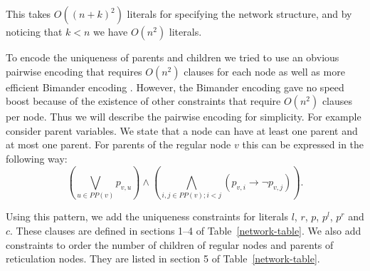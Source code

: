 \documentclass[runningheads, envcountsame, a4paper]{llncs}
\begin{document}
This takes $O((n + k)^2)$ literals for specifying the network structure, and by noticing that $k < n$ we have $O(n^2)$ literals.

To encode the uniqueness of parents and children we tried to use an obvious pairwise encoding that requires 
$O(n^2)$ clauses for each node as well as more efficient Bimander encoding \cite{nguyenefficient}. However, the Bimander encoding gave no speed boost because of the existence of other constraints that require $O(n^2)$ clauses per node.
Thus we will describe the pairwise encoding for simplicity.
For example consider parent variables. We state that a node can have at least one parent and at most one parent. For parents of the regular node $v$ this can be expressed 
in the following way: 
$$\left(\bigvee\limits_{u \in PP(v)} p_{v,u}\right) \wedge \left(\bigwedge\limits_{i, j \in PP(v);i < j} \left(p_{v,i} \rightarrow \neg p_{v,j}\right)\right).$$

Using this pattern, we add the uniqueness constraints for literals $l$, $r$, $p$, $p^l$, $p^r$ and $c$. 
These clauses are defined in sections 1--4 of Table~\ref{network-table}. 
We also add constraints to order the number of children of regular nodes and parents of reticulation nodes.
They are listed in section 5 of Table~\ref{network-table}.
\end{document}
